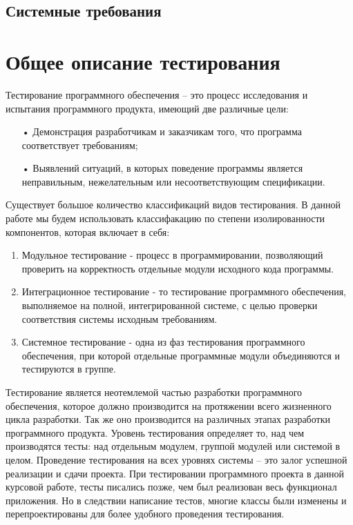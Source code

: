 \documentclass[a4paper,12pt]{article}
\begin{document}
\subsection{Системные требования}

\newpage\section{Общее описание тестирования}
Тестирование программного обеспечения – это процесс исследования и испытания программного продукта, имеющий две различные цели: 
\begin{itemize}
\item[•]Демонстрация разработчикам и заказчикам того, что программа соответствует требованиям;
\item[•]Выявлений ситуаций, в которых поведение программы является неправильным, нежелательным или несоответствующим спецификации.
\end{itemize}
Существует большое количество классификаций видов тестирования. В данной работе мы будем использовать классифакацию по степени изолированности компонентов, которая включает в себя: 
\begin{enumerate}
\item Модульное тестирование - процесс в программировании, позволяющий проверить на корректность отдельные модули исходного кода программы.
\item Интеграционное тестирование - то тестирование программного обеспечения, выполняемое на полной, интегрированной системе, с целью проверки соответствия системы исходным требованиям.
\item Системное тестирование - одна из фаз тестирования программного обеспечения, при которой отдельные программные модули объединяются и тестируются в группе.
\end{enumerate}
Тестирование является неотемлемой частью разработки программного обеспечения, которое должно производится на протяжении всего жизненного цикла разработки. Так же оно производится на различных этапах разработки программного продукта. Уровень тестирования определяет то, над чем производятся тесты: над отдельным модулем, группой модулей или системой в целом. Проведение тестирования на всех уровнях системы – это залог успешной реализации и сдачи проекта.
При тестировании программного проекта в данной курсовой работе, тесты писались позже, чем был реализован весь функционал приложения. Но в следствии написание тестов, многие классы были изменены и перепроектированы для более удобного проведения тестирования.
\end{document}
